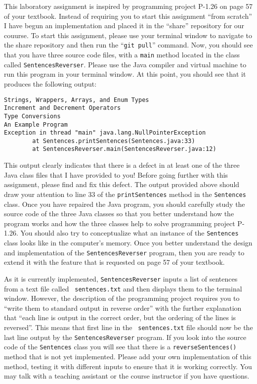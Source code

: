 This laboratory assignment is inspired by programming project P-1.26 on page 57 of your textbook. Instead of requiring
you to start this assignment ``from scratch'' I have begun an implementation and placed it in the ``share'' repository
for our couurse. To start this assignment, please use your terminal window to navigate to the share repository and then
run the ``{\tt git pull}'' command. Now, you should see that you have three source code files, with a {\tt main}
method located in the class called {\tt SentencesReverser}. Please use the Java compiler and virtual machine to run this
program in your terminal window. At this point, you should see that it produces the following output:

\begin{verbatim}
Strings, Wrappers, Arrays, and Enum Types
Increment and Decrement Operators
Type Conversions
An Example Program
Exception in thread "main" java.lang.NullPointerException
        at Sentences.printSentences(Sentences.java:33)
        at SentencesReverser.main(SentencesReverser.java:12)
\end{verbatim}

This output clearly indicates that there is a defect in at least one of the three Java class files that I have provided
to you! Before going further with this assignment, please find and fix this defect. The output provided above should
draw your attention to line 33 of the {\tt printSentences} method in the {\tt Sentences} class. Once you have repaired
the Java program, you should carefully study the source code of the three Java classes so that you better understand how
the program works and how the three classes help to solve programming project P-1.26. You should also try to
conceptualize what an instance of the {\tt Sentences} class looks like in the computer's memory. Once you better
understand the design and implementation of the {\tt SentencesReverser} program, then you are ready to extend it with
the feature that is requested on page 57 of your textbook.

As it is currently implemented, {\tt SentencesReverser} inputs a list of sentences from a text file called {\tt
sentences.txt} and then displays them to the terminal window. However, the description of the programming project
requires you to ``write them to standard output in reverse order'' with the further explanation that ``each line is
output in the correct order, but the ordering of the lines is reversed''. This means that first line in the {\tt
sentences.txt} file should now be the last line output by the {\tt SentencesReverser} program. If you look into the
source code of the {\tt Sentences} class you will see that there is a {\tt reverseSentences()} method that is not yet
implemented. Please add your own implementation of this method, testing it with different inputs to ensure that it is
working correctly. You may talk with a teaching assistant or the course instructor if you have questions.


